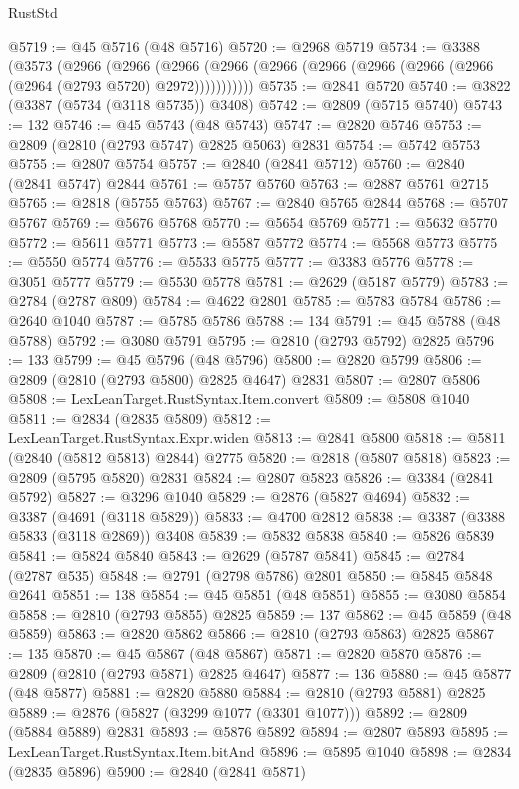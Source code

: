 \begin{lexlean}{RustStd}
\begin{coremodule}
@5719 := @45 @5716 (@48 @5716)
@5720 := @2968 @5719
@5734 := @3388
    (@3573
      (@2966
        (@2966
          (@2966 (@2966 (@2966 (@2966 (@2966 (@2966 (@2966 (@2964 (@2793 @5720) @2972)))))))))))
@5735 := @2841 @5720
@5740 := @3822 (@3387 (@5734 (@3118 @5735)) @3408)
@5742 := @2809 (@5715 @5740)
@5743 := 132
@5746 := @45 @5743 (@48 @5743)
@5747 := @2820 @5746
@5753 := @2809 (@2810 (@2793 @5747) @2825 @5063) @2831
@5754 := @5742 @5753
@5755 := @2807 @5754
@5757 := @2840 (@2841 @5712)
@5760 := @2840 (@2841 @5747) @2844
@5761 := @5757 @5760
@5763 := @2887 @5761 @2715
@5765 := @2818 (@5755 @5763)
@5767 := @2840 @5765 @2844
@5768 := @5707 @5767
@5769 := @5676 @5768
@5770 := @5654 @5769
@5771 := @5632 @5770
@5772 := @5611 @5771
@5773 := @5587 @5772
@5774 := @5568 @5773
@5775 := @5550 @5774
@5776 := @5533 @5775
@5777 := @3383 @5776
@5778 := @3051 @5777
@5779 := @5530 @5778
@5781 := @2629 (@5187 @5779)
@5783 := @2784 (@2787 @809)
@5784 := @4622 @2801
@5785 := @5783 @5784
@5786 := @2640 @1040
@5787 := @5785 @5786
@5788 := 134
@5791 := @45 @5788 (@48 @5788)
@5792 := @3080 @5791
@5795 := @2810 (@2793 @5792) @2825
@5796 := 133
@5799 := @45 @5796 (@48 @5796)
@5800 := @2820 @5799
@5806 := @2809 (@2810 (@2793 @5800) @2825 @4647) @2831
@5807 := @2807 @5806
@5808 := LexLeanTarget.RustSyntax.Item.convert
@5809 := @5808 @1040
@5811 := @2834 (@2835 @5809)
@5812 := LexLeanTarget.RustSyntax.Expr.widen
@5813 := @2841 @5800
@5818 := @5811 (@2840 (@5812 @5813) @2844) @2775
@5820 := @2818 (@5807 @5818)
@5823 := @2809 (@5795 @5820) @2831
@5824 := @2807 @5823
@5826 := @3384 (@2841 @5792)
@5827 := @3296 @1040
@5829 := @2876 (@5827 @4694)
@5832 := @3387 (@4691 (@3118 @5829))
@5833 := @4700 @2812
@5838 := @3387 (@3388 @5833 (@3118 @2869)) @3408
@5839 := @5832 @5838
@5840 := @5826 @5839
@5841 := @5824 @5840
@5843 := @2629 (@5787 @5841)
@5845 := @2784 (@2787 @535)
@5848 := @2791 (@2798 @5786) @2801
@5850 := @5845 @5848 @2641
@5851 := 138
@5854 := @45 @5851 (@48 @5851)
@5855 := @3080 @5854
@5858 := @2810 (@2793 @5855) @2825
@5859 := 137
@5862 := @45 @5859 (@48 @5859)
@5863 := @2820 @5862
@5866 := @2810 (@2793 @5863) @2825
@5867 := 135
@5870 := @45 @5867 (@48 @5867)
@5871 := @2820 @5870
@5876 := @2809 (@2810 (@2793 @5871) @2825 @4647)
@5877 := 136
@5880 := @45 @5877 (@48 @5877)
@5881 := @2820 @5880
@5884 := @2810 (@2793 @5881) @2825
@5889 := @2876 (@5827 (@3299 @1077 (@3301 @1077)))
@5892 := @2809 (@5884 @5889) @2831
@5893 := @5876 @5892
@5894 := @2807 @5893
@5895 := LexLeanTarget.RustSyntax.Item.bitAnd
@5896 := @5895 @1040
@5898 := @2834 (@2835 @5896)
@5900 := @2840 (@2841 @5871)

\end{coremodule}
\end{lexlean}
